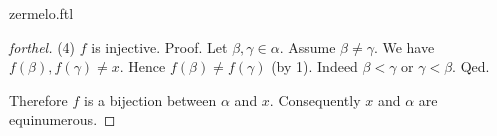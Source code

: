 \documentclass{naproche-library}
\begin{document}
\begin{smodule}[title=Zermelo's Well-Ordering Theorem]{zermelo.ftl}
\begin{proof}[forthel]
  (4) $f$ is injective. \newline
  Proof.
    Let $\beta, \gamma \in \alpha$.
    Assume $\beta \neq \gamma$.
    We have $f(\beta), f(\gamma) \neq x$.
    Hence $f(\beta) \neq f(\gamma)$ (by 1).
    Indeed $\beta < \gamma$ or $\gamma < \beta$.
  Qed.

  Therefore $f$ is a bijection between $\alpha$ and $x$.
  Consequently $x$ and $\alpha$ are equinumerous.
\end{proof}
\end{smodule}
\end{document}
